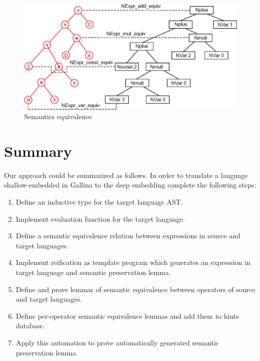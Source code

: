 \documentclass[sigplan]{acmart}\settopmatter{printfolios=true,printccs=false,printacmref=false}
\begin{document}
\begin{figure}[h]
  \includegraphics[width=\columnwidth]{trees.eps}
  \caption{Semantics equivalence}
  \label{fig:trees}
\end{figure}

\section{Summary}

Our approach could be summarized as follows. In order to translate a
language shallow-embedded in Gallina to the deep embedding complete
the following steps:

\begin{enumerate}
\item Define an inductive type for the target language AST.
\item Implement evaluation function for the target language.
\item Define a semantic equivalence relation between expressions in
  source and target languages.
\item Implement reification as template program which generates an
  expression in target language and semantic preservation lemma.
\item Define and prove lemmas of semantic equivalence between
  operators of source and target languages.
\item Define per-operator semantic equivalence lemmas and add them to
  hints database.
\item Apply this automation to prove automatically generated semantic
  preservation lemma.  
\end{enumerate}



\nocite{*}

\end{document}
